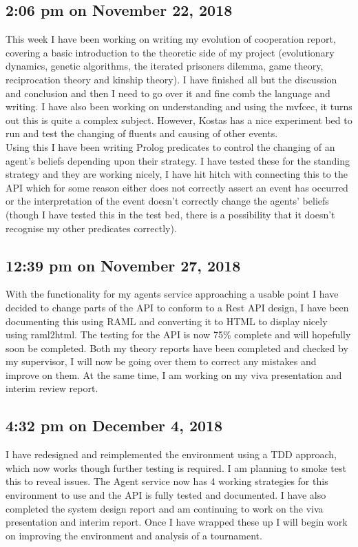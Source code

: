 \documentclass[]{final_report}
\begin{document}
\subsection*{2:06 pm on November 22, 2018}
This week I have been working on writing my evolution of cooperation report, covering a basic introduction to the theoretic side of my project (evolutionary dynamics, genetic algorithms, the iterated prisoners dilemma, game theory, reciprocation theory and kinship theory). I have finished all but the discussion and conclusion and then I need to go over it and fine comb the language and writing. I have also been working on understanding and using the mvfcec, it turns out this is quite a complex subject. However, Kostas has a nice experiment bed to run and test the changing of fluents and causing of other events.\\
Using this I have been writing Prolog predicates to control the changing of an agent’s beliefs depending upon their strategy. I have tested these for the standing strategy and they are working nicely, I have hit hitch with connecting this to the API which for some reason either does not correctly assert an event has occurred or the interpretation of the event doesn’t correctly change the agents’ beliefs (though I have tested this in the test bed, there is a possibility that it doesn’t recognise my other predicates correctly). 

\subsection*{12:39 pm on November 27, 2018}
With the functionality for my agents service approaching a usable point I have decided to change parts of the API to conform to a Rest API design, I have been documenting this using RAML and converting it to HTML to display nicely using raml2html. The testing for the API is now 75\% complete and will hopefully soon be completed. Both my theory reports have been completed and checked by my supervisor, I will now be going over them to correct any mistakes and improve on them. At the same time, I am working on my viva presentation and interim review report.
 
\subsection*{4:32 pm on December 4, 2018}
I have redesigned and reimplemented the environment using a TDD approach, which now works though further testing is required. I am planning to smoke test this to reveal issues. The Agent service now has 4 working strategies for this environment to use and the API is fully tested and documented. I have also completed the system design report and am continuing to work on the viva presentation and interim report. Once I have wrapped these up I will begin work on improving the environment and analysis of a tournament. 
\end{document}
